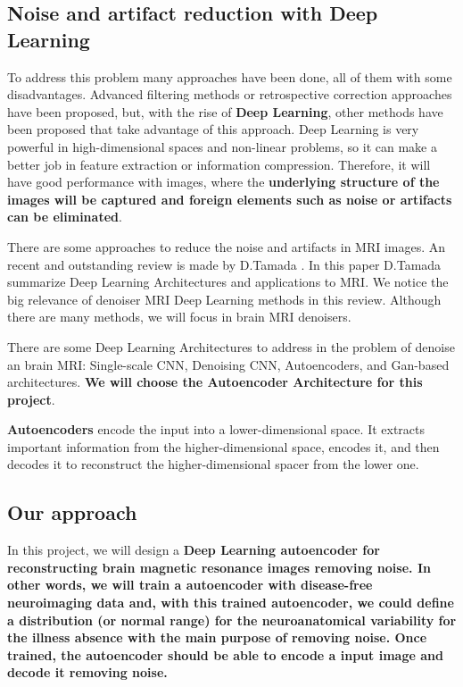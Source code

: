 \subsection{Noise and artifact reduction with Deep Learning}

To address this problem many approaches have been done, all of them with some disadvantages. Advanced filtering methods \cite{filtermeth12} or retrospective correction approaches have been proposed, but, with the rise of \textbf{Deep Learning}, other methods have been proposed that take advantage of this approach. Deep Learning is very powerful in high-dimensional spaces and non-linear problems, so it can make a better job in feature extraction or information compression. Therefore, it will have good performance with images, where the \textbf{underlying structure of the images will be captured and foreign elements such as noise or artifacts can be eliminated}. 

There are some approaches to reduce the noise and artifacts in MRI images. An recent and outstanding review is made by D.Tamada \cite{tamada2020review}. In this paper D.Tamada summarize Deep Learning Architectures and applications to MRI. We notice the big relevance of denoiser MRI Deep Learning methods in this review. Although there are many methods, we will focus in brain MRI denoisers. 

There are some Deep Learning Architectures to address in the problem of denoise an brain MRI: Single-scale CNN, Denoising CNN, Autoencoders, and Gan-based architectures. \textbf{We will choose the Autoencoder Architecture for this project}.

\textbf{Autoencoders} \cite{autoencoder} encode the input into a lower-dimensional space. It extracts important information from the higher-dimensional space, encodes it, and then decodes it to reconstruct the higher-dimensional spacer from the lower one. 



\subsection{Our approach}

\begin{tcolorbox}
In this project, we will design a \textbf{Deep Learning autoencoder for reconstructing brain magnetic resonance images removing noise. In other words, we will train a autoencoder with disease-free neuroimaging data and, with this trained autoencoder, we could define a distribution (or normal range) for the neuroanatomical variability for the illness absence with the main purpose of removing noise. Once trained, the autoencoder should be able to encode a input image and decode it removing noise.}
\end{tcolorbox}

